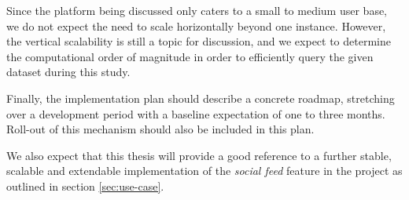Since the platform being discussed only caters to a small to medium user base, we do not expect the need to scale horizontally beyond one instance. However, the vertical scalability is still a topic for discussion, and we expect to determine the computational order of magnitude in order to efficiently query the given dataset during this study.

Finally, the implementation plan should describe a concrete roadmap, stretching over a development period with a baseline expectation of one to three months. Roll-out of this mechanism should also be included in this plan.

We also expect that this thesis will provide a good reference to a further stable, scalable and extendable implementation of the \textit{social feed} feature in the \textcite{OpenWebslides} project as outlined in section \ref{sec:use-case}.
